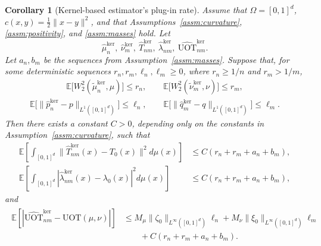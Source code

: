 \documentclass[11pt,reqno]{amsart}
\newtheorem{corollary}[theorem]{Corollary}
\theoremstyle{definition}
\renewcommand{\hat}{\widehat}
\renewcommand{\tilde}{\widetilde}
\newcommand{\Ep}{\mathbb{E}}
\begin{document}
\begin{corollary}[Kernel-based estimator's plug-in rate]
\label{cor:uot_cube_kernel_rate_transfer}
Assume that $\Omega=[0,1]^d$, $c(x,y)=\tfrac{1}{2}\|x-y\|^2$, and that Assumptions~\ref{assm:curvature}, \ref{assm:positivity}, and \ref{assm:masses} hold.
Let
\[
    \hat\mu_n^{\mathrm{ker}},\ \hat\nu_m^{\mathrm{ker}},\ \hat T_{nm}^{\mathrm{ker}},\ \hat\lambda_{nm}^{\mathrm{ker}},\ \widehat{\mathrm{UOT}}_{nm}^{\mathrm{ker}}.
\]
Let $a_n,b_m$ be the sequences from Assumption~\ref{assm:masses}.
Suppose that, for some deterministic sequences $r_n,r_m,\ell_n,\ell_m\ge 0$, where $r_n \ge 1/n$ and $r_m > 1/m$,
\begin{align}
    \Ep\bigl[W_2^2(\tilde\mu_n^{\mathrm{ker}},\mu)\bigr] \le r_n,
    \qquad
    \Ep\bigl[W_2^2(\tilde\nu_m^{\mathrm{ker}},\nu)\bigr] \le r_m,
\end{align}
\begin{align}
    \Ep\bigl[\|\hat p_n^{\mathrm{ker}}-p\|_{L^1([0,1]^d)}\bigr] \le \ell_n,
    \qquad
    \Ep\bigl[\|\hat q_m^{\mathrm{ker}}-q\|_{L^1([0,1]^d)}\bigr] \le \ell_m.
\end{align}
Then there exists a constant $C>0$, depending only on the constants in Assumption~\ref{assm:curvature}, such that
\begin{align}
\label{eq:uot_cube_kernel_rate_transfer_map}
    \Ep\left[
        \int_{[0,1]^d}
        \|\hat T_{nm}^{\mathrm{ker}}(x)-T_0(x)\|^2 d\mu(x)
    \right]
    &\le C(r_n+r_m+a_n+b_m),
\\
\label{eq:uot_cube_kernel_rate_transfer_lambda}
    \Ep\left[
        \int_{[0,1]^d}
        |\hat\lambda_{nm}^{\mathrm{ker}}(x)-\lambda_0(x)|^2 d\mu(x)
    \right]
    &\le C(r_n+r_m+a_n+b_m),
\end{align}
and
\begin{align}
\label{eq:uot_cube_kernel_rate_transfer_abs_value}
\begin{aligned}
    \Ep\left[
        \left|
            \widehat{\mathrm{UOT}}_{nm}^{\mathrm{ker}}
            -
            \mathrm{UOT}(\mu,\nu)
        \right|
    \right]
    &\le M_\mu\|\zeta_0\|_{L^\infty([0,1]^d)}\ell_n
    + M_\nu\|\xi_0\|_{L^\infty([0,1]^d)}\ell_m \\
    &\qquad + C(r_n+r_m+a_n+b_m).
\end{aligned}
\end{align}
\end{corollary}
\end{document}
